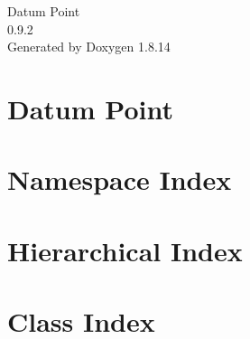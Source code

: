 \documentclass[twoside]{book}
\newcommand{\+}{\discretionary{\mbox{\scriptsize$\hookleftarrow$}}{}{}}
\newcommand{\clearemptydoublepage}{%
  \newpage{\pagestyle{empty}\cleardoublepage}%
}
\begin{document}
\hypersetup{pageanchor=false,
             bookmarksnumbered=true,
             pdfencoding=unicode
            }
\begin{titlepage}
\vspace*{7cm}
\begin{center}%
{\Large Datum Point \\[1ex]\large 0.\+9.\+2 }\\
\vspace*{1cm}
{\large Generated by Doxygen 1.8.14}\\
\end{center}
\end{titlepage}
\clearemptydoublepage
{}
\tableofcontents
\clearemptydoublepage
{}
\hypersetup{pageanchor=true}

\chapter{Datum Point}
\label{md__d_1__work__git_hub_datum-point__r_e_a_d_m_e}

\chapter{Namespace Index}

\chapter{Hierarchical Index}

\chapter{Class Index}

\end{document}
